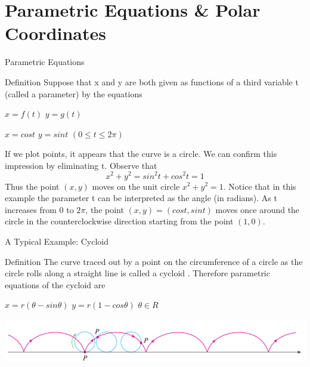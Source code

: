 
\section{Parametric Equations \& Polar Coordinates}
\begin{frame}{Parametric Equations}
    \begin{block}{Definition}
        Suppose that x and y are both given as functions of a third variable t
        (called a parameter) by the equations\\
        \begin{center}
            $x=f(t)$  $y=g(t)$
        \end{center}
    \end{block}
    \begin{center}
        $x=cost$ $y=sin t$ $(0 \leqslant t \leqslant 2\pi)$\\
    \end{center}
    If we plot points, it appears that the curve is a circle. We can confirm this
    impression by eliminating t. Observe that
    $$x^2+y^2=sin^2t +cos^2 t= 1$$
    Thus the point $(x,y)$ moves on the unit circle $x^2+y^2=1$. Notice that in
    this example the parameter t can be interpreted as the angle (in radians).
    As t increases from 0 to 2$\pi$, the point $(x,y) = (cost,sint)$ moves once
    around the circle in the counterclockwise direction starting from the point
    $(1,0)$.
\end{frame}

\begin{frame}{A Typical Example: Cycloid}
    \begin{block}{Definition}
        The curve traced out by a point on the circumference of a circle as the
        circle rolls along a straight line is called a cycloid .
        Therefore parametric equations of the cycloid are
        \begin{center}
            $x=r(\theta-sin\theta)$ $y=r(1-cos\theta)$ $ \theta \in R$
        \end{center}
    \end{block}
    \begin{center}
        \includegraphics[width=0.95\linewidth]{res/Cycloid.png}
    \end{center}
\end{frame}

